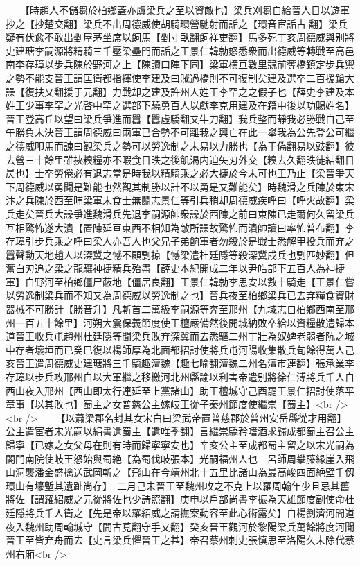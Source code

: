 　　【時趙人不儲芻於柏鄉蓋亦虞梁兵之至以資敵也】梁兵刈芻自給晉人日以遊軍抄之【抄楚交翻】梁兵不出周德威使胡騎環營馳射而詬之【環音宦詬古翻】梁兵疑有伏愈不敢出剉屋茅坐席以飼馬【剉寸臥翻飼祥吏翻】馬多死丁亥周德威與别將史建瑭李嗣源將精騎三千壓梁壘門而詬之王景仁韓勍怒悉衆而出德威等轉戰至高邑南李存璋以步兵陳於野河之上【陳讀曰陣下同】梁軍横亘數里競前奪橋鎮定步兵禦之勢不能支晉王謂匡衛都指揮使李建及曰賊過橋則不可復制矣建及選卒二百援鎗大譟【復扶又翻援于元翻】力戰却之建及許州人姓王李罕之之假子也【薛史李建及本姓王少事李罕之光啓中罕之選部下驍勇百人以獻李克用建及在籍中後以功賜姓名】晉王登高丘以望曰梁兵爭進而囂【囂虛驕翻又牛刀翻】我兵整而靜我必勝戰自己至午勝負未決晉王謂周德威曰兩軍已合勢不可離我之興亡在此一舉我為公先登公可繼之德威叩馬而諫曰觀梁兵之勢可以勞逸制之未易以力勝也【為于偽翻易以豉翻】彼去營三十餘里雖挾糗糧亦不暇食日昳之後飢渴内迫矢刃外交【糗去久翻昳徒結翻日昃也】士卒勞倦必有退志當是時我以精騎乘之必大捷於今未可也王乃止【梁晉爭天下周德威以勇聞是難能也然觀其制勝以計不以勇是又難能矣】時魏滑之兵陳於東宋汴之兵陳於西至晡梁軍未食士無鬬志景仁等引兵稍却周德威疾呼曰【呼火故翻】梁兵走矣晉兵大譟爭進魏滑兵先退李嗣源帥衆譟於西陳之前曰東陳已走爾何久留梁兵互相驚怖遂大潰【置陳延亘東西不相知為敵所譟故驚怖而潰帥讀曰率怖普布翻】李存璋引步兵乘之呼曰梁人亦吾人也父兄子弟餉軍者勿殺於是戰士悉解甲投兵而弃之囂聲動天地趙人以深冀之憾不顧剽掠【憾梁遣杜廷隱等殺深冀戍兵也剽匹妙翻】但奮白刃追之梁之龍驤神捷精兵殆盡【薛史本紀開成二年以尹皓部下五百人為神捷軍】自野河至柏鄉僵尸蔽地【僵居良翻】王景仁韓勍李思安以數十騎走【王景仁嘗以勞逸制梁兵而不知又為周德威以勞逸制之也】晉兵夜至柏鄉梁兵已去弃糧食資財器械不可勝計【勝音升】凡斬首二萬級李嗣源等奔至邢州【九域志自柏鄉西南至邢州一百五十餘里】河朔大震保義節度使王檀嚴備然後開城納敗卒給以資糧散遣歸本道晉王收兵屯趙州杜廷隱等聞梁兵敗弃深冀而去悉驅二州丁壯為奴婢老弱者阬之城中存者壞垣而已癸巳復以楊師厚為北面都招討使將兵屯河陽收集散兵旬餘得萬人己亥晉王遣周德威史建瑭將三千騎趣澶魏【趣七喻翻澶魏二州名澶市連翻】張承業李存璋以步兵攻邢州自以大軍繼之移檄河北州縣諭以利害帝遣别將徐仁溥將兵千人自西山夜入邢州【西山即太行連延至上黨諸山】助王檀城守己酉罷王景仁招討使落平章事【以其敗也】蜀主之女普慈公主嫁岐王從子秦州節度使繼崇【蜀主】<br />
<br />
　　【以蕭梁郡名封其女宋白曰梁武帝置普慈郡於普州安岳縣從才用翻】公主遣宦者宋光嗣以絹書遺蜀主【遺唯季翻】言繼崇驕矜嗜酒求歸成都蜀主召公主歸寧【已嫁之女父母在則有時而歸寧寧安也】辛亥公主至成都蜀主留之以宋光嗣為閤門南院使岐王怒始與蜀絶【為蜀伐岐張本】光嗣福州人也　呂師周攀藤緣崖入飛山洞襲潘金盛擒送武岡斬之【飛山在今靖州北十五里比諸山為最高峻四面絶壁千仭環山有壕塹其遺趾尚存】　二月己未晉王至魏州攻之不克上以羅周翰年少且忌其舊將佐【謂羅紹威之元從將佐也少詩照翻】庚申以戶部尚書李振為天雄節度副使命杜廷隱將兵千人衛之【先是帝以羅紹威之請撫案動容至此心術露矣】自楊劉濟河間道夜入魏州助周翰城守【間古莧翻守手又翻】癸亥晉王觀河於黎陽梁兵萬餘將度河聞晉王至皆弃舟而去【史言梁兵懼晉王之甚】帝召蔡州刺史張慎思至洛陽久未除代蔡州右廂<br />
